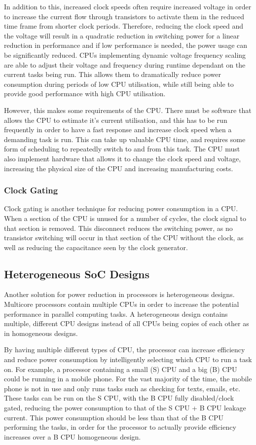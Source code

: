 In addition to this, increased clock speeds often require increased voltage in order to increase the current flow through transistors to activate them in the reduced time frame from shorter clock periods. Therefore, reducing the clock speed and the voltage will result in a quadratic reduction in switching power for a linear reduction in performance and if low performance is needed, the power usage can be significantly reduced. CPUs implementing dynamic voltage frequency scaling are able to adjust their voltage and frequency during runtime dependant on the current tasks being run. This allows them to dramatically reduce power consumption during periods of low CPU utilisation, while still being able to provide good performance with high CPU utilisation.

However, this makes some requirements of the CPU. There must be software that allows the CPU to estimate it's current utilisation, and this has to be run frequently in order to have a fast response and increase clock speed when a demanding task is run. This can take up valuable CPU time, and requires some form of scheduling to repeatedly switch to and from this task. The CPU must also implement hardware that allows it to change the clock speed and voltage, increasing the physical size of the CPU and increasing manufacturing costs.

\subsubsection{Clock Gating}
Clock gating is another technique for reducing power consumption in a CPU. When a section of the CPU is unused for a number of cycles, the clock signal to that section is removed. This disconnect reduces the switching power, as no transistor switching will occur in that section of the CPU without the clock, as well as reducing the capacitance seen by the clock generator.

\subsection{Heterogeneous SoC Designs}
Another solution for power reduction in processors is heterogeneous designs. Multicore processors contain multiple CPUs in order to increase the potential performance in parallel computing tasks. A heterogeneous design contains multiple, different CPU designs instead of all CPUs being copies of each other as in homogeneous designs.

By having multiple different types of CPU, the processor can increase efficiency and reduce power consumption by intelligently selecting which CPU to run a task on. For example, a processor containing a small (S) CPU and a big (B) CPU could be running in a mobile phone. For the vast majority of the time, the mobile phone is not in use and only runs tasks such as checking for texts, emails, etc. These tasks can be run on the S CPU, with the B CPU fully disabled/clock gated, reducing the power consumption to that of the S CPU + B CPU leakage current. This power consumption should be less than that of the B CPU performing the tasks, in order for the processor to actually provide efficiency increases over a B CPU homogeneous design.

